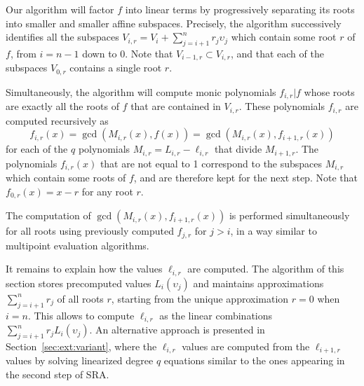 \documentclass{sig-alternate}
\newcounter{algo}
\begin{document}
Our algorithm will factor $f$ into linear terms by progressively separating its roots into smaller and smaller affine subspaces. 
%
Precisely, the algorithm successively identifies all the subspaces $V_{i,r}=V_{i}+\sum_{j=i+1}^nr_j\upsilon_j$ which contain some root $r$ of $f$, from $i=n-1$ down to 0. Note that $V_{i-1,r}\subset V_{i,r}$, and that each of the subspaces $V_{0,r}$ contains a single root $r$.

Simultaneously, the algorithm will compute monic polynomials $f_{i,r}|f$ whose roots are exactly all the roots of $f$ that are contained in $V_{i,r}$. 
%
These polynomials $f_{i,r}$ are computed recursively as
$$f_{i,r}(x)=\gcd(M_{i,r}(x),f(x))
=\gcd(M_{i,r}(x),f_{i+1,r}(x))$$
for each of the $q$ polynomials $M_{i,r}=L_{i,r}-\ell_{i,r}$ that divide $M_{i+1,r}$. The polynomials $f_{i,r}(x)$ that are not equal to 1 correspond to the subspaces $M_{i,r}$ which contain some roots of $f$, and are therefore kept for the next step.
%
Note that $f_{0,r}(x)=x-r$ for any root $r$.

The computation of $\gcd(M_{i,r}(x),f_{i+1,r}(x))$ is performed simultaneously for all roots using previously computed $f_{j,r}$ for $j>i$, in a way similar to multipoint evaluation algorithms.

It remains to explain how the values $\ell_{i,r}$ are computed.
The algorithm of this section stores precomputed values $L_i(\upsilon_{j})$ and maintains approximations $\sum_{j=i+1}^nr_j$ of all roots $r$, starting from the unique approximation $r=0$ when $i=n$. 
This allows to compute $\ell_{i,r}$ as the linear combinations $\sum_{j=i+1}^nr_jL_i(\upsilon_{j})$. 
An alternative approach is presented in Section~\ref{sec:ext:variant}, where the $\ell_{i,r}$ values are computed from the $\ell_{i+1,r}$ values by solving linearized degree $q$ equations similar to the ones appearing in the second step of SRA.
\end{document}
